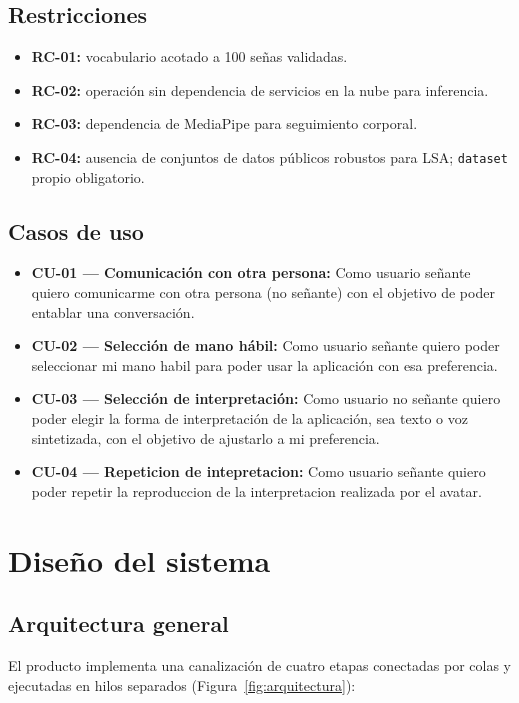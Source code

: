 \documentclass[12pt,a4paper]{report}
\begin{document}
\section{Restricciones}
\begin{itemize}
    \item \textbf{RC-01:} vocabulario acotado a 100 señas validadas.
    \item \textbf{RC-02:} operación sin dependencia de servicios en la nube para inferencia.
    \item \textbf{RC-03:} dependencia de MediaPipe para seguimiento corporal.
    \item \textbf{RC-04:} ausencia de conjuntos de datos públicos robustos para LSA; \texttt{dataset} propio obligatorio.
\end{itemize}

\section{Casos de uso}
\begin{itemize}
\item \textbf{CU-01 --- Comunicación con otra persona:} Como usuario señante quiero comunicarme con otra persona (no señante) con el objetivo de poder entablar una conversación.
\item \textbf{CU-02 --- Selección de mano hábil:} Como usuario señante quiero poder seleccionar mi mano habil para poder usar la aplicación con esa preferencia.
\item \textbf{CU-03 --- Selección de interpretación:} Como usuario no señante quiero poder elegir la forma de interpretación de la aplicación, sea texto o voz sintetizada, con el objetivo de ajustarlo a mi preferencia.
\item \textbf{CU-04 --- Repeticion de intepretacion:} Como usuario señante quiero poder repetir la reproduccion de la interpretacion realizada por el avatar.
\end{itemize}

\chapter{Diseño del sistema}
\section{Arquitectura general}
El producto implementa una canalización de cuatro etapas conectadas por colas y ejecutadas en hilos separados (Figura~\ref{fig:arquitectura}):
\end{document}
